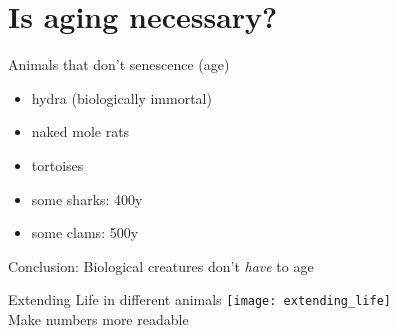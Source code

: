 \section{Is aging necessary?}


\begin{frame}[c]{Animals that don't senescence (age)}
    \large
    \begin{itemize}[<+(1)->]
        \item hydra (biologically immortal) \cite{martinez1998mortality}
        \item naked mole rats \cite{ruby2018naked}
        \item tortoises \cite{miller2001escaping}
        \item some sharks: 400y \cite{Greenlan67:online}
        \item some clams: 500y \cite{munro2012extreme}
    \end{itemize}
    \pause
    Conclusion: Biological creatures don't {\em have} to age
\end{frame}



\begin{frame}[c]{Extending Life in different animals}
    \texttt{[image: extending\_life]} \\
    \cite{bulterijs2015time} Make numbers more readable
\end{frame}


